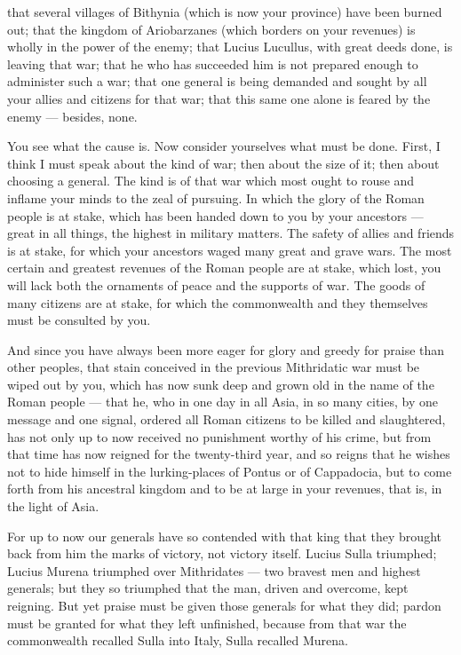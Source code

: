  that several villages of Bithynia (which is now your province) have been burned out; that the kingdom of Ariobarzanes (which borders on your revenues) is wholly in the power of the enemy; that Lucius Lucullus, with great deeds done, is leaving that war; that he who has succeeded him is not prepared enough to administer such a war; that one general is being demanded and sought by all your allies and citizens for that war; that this same one alone is feared by the enemy --- besides, none.

 You see what the cause is. Now consider yourselves what must be done. First, I think I must speak about the kind of war; then about the size of it; then about choosing a general. The kind is of that war which most ought to rouse and inflame your minds to the zeal of pursuing. In which the glory of the Roman people is at stake, which has been handed down to you by your ancestors --- great in all things, the highest in military matters. The safety of allies and friends is at stake, for which your ancestors waged many great and grave wars. The most certain and greatest revenues of the Roman people are at stake, which lost, you will lack both the ornaments of peace and the supports of war. The goods of many citizens are at stake, for which the commonwealth and they themselves must be consulted by you.

 And since you have always been more eager for glory and greedy for praise than other peoples, that stain conceived in the previous Mithridatic war must be wiped out by you, which has now sunk deep and grown old in the name of the Roman people --- that he, who in one day in all Asia, in so many cities, by one message and one signal, ordered all Roman citizens to be killed and slaughtered, has not only up to now received no punishment worthy of his crime, but from that time has now reigned for the twenty-third year, and so reigns that he wishes not to hide himself in the lurking-places of Pontus or of Cappadocia, but to come forth from his ancestral kingdom and to be at large in your revenues, that is, in the light of Asia.

 For up to now our generals have so contended with that king that they brought back from him the marks of victory, not victory itself. Lucius Sulla triumphed; Lucius Murena triumphed over Mithridates --- two bravest men and highest generals; but they so triumphed that the man, driven and overcome, kept reigning. But yet praise must be given those generals for what they did; pardon must be granted for what they left unfinished, because from that war the commonwealth recalled Sulla into Italy, Sulla recalled Murena.


